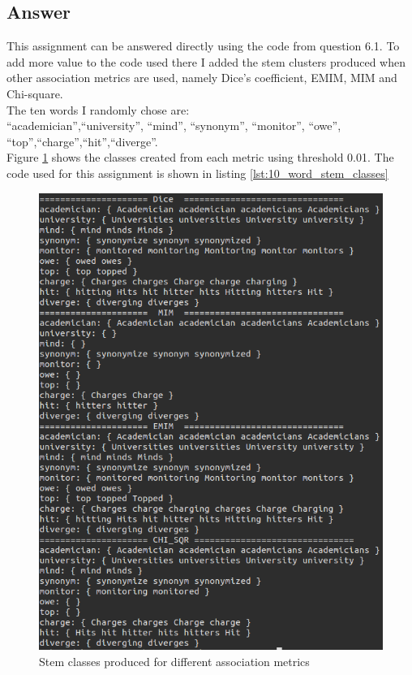 \documentclass{article}
\begin{document}
	\subsection*{Answer}
	This assignment can be answered directly using the code from question 6.1. To add more value to the code used there I added the stem clusters produced when other association metrics are used, namely Dice's coefficient, EMIM, MIM and Chi-square. \\The ten words I randomly chose are:\\ \textquotedblleft academician\textquotedblright ,\textquotedblleft university\textquotedblright, \textquotedblleft mind\textquotedblright, \textquotedblleft synonym\textquotedblright, \textquotedblleft monitor\textquotedblright, \textquotedblleft owe\textquotedblright,  \textquotedblleft top\textquotedblright ,\textquotedblleft charge\textquotedblright ,\textquotedblleft hit\textquotedblright ,\textquotedblleft diverge\textquotedblright.\\
	Figure \ref{fig:10_word_stem_classes} shows the classes created from each metric using threshold 0.01. The code used for this assignment is shown in listing \ref{lst:10_word_stem_classes}
	
	\begin{figure}[h!]
		\includegraphics[width=\linewidth]{10_stem_classes.png}
		\caption{Stem classes produced for different association metrics}
		\label{fig:10_word_stem_classes}
	\end{figure}
\end{document}
